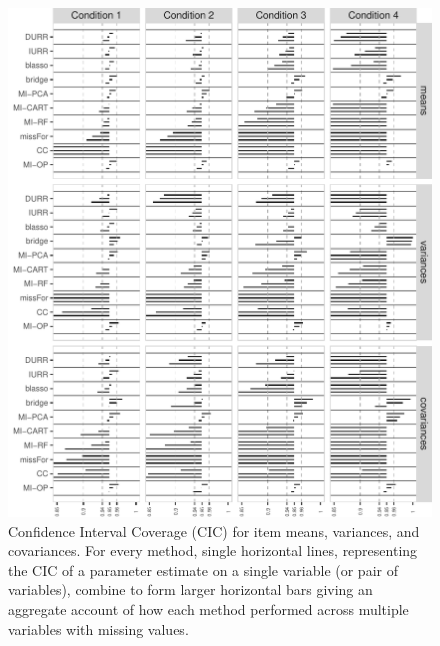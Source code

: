 \begin{figure}
\centering
\includegraphics{../../output/graphs/exp1_CI_summy.pdf}
\caption{\label{fig:exp1cir}
	Confidence Interval Coverage (CIC) for item means, variances, and covariances. 
	For every method, single horizontal lines, representing the CIC of a parameter estimate on 
	a single variable (or pair of variables), combine to form larger horizontal bars giving an 
	aggregate account of how each method performed across multiple variables with missing values.
	}
\end{figure}
	
\FloatBarrier %

